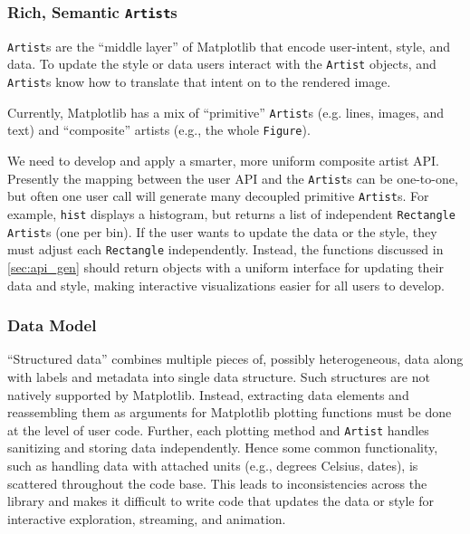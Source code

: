 \documentclass[11pt,letterpaper]{article}  %
\begin{document}
\subsubsection{Rich, Semantic \texttt{Artist}s}
\label{sec:artists}
\texttt{Artist}s are the ``middle layer'' of Matplotlib that encode
user-intent, style, and data.
To update the style or data users interact with the \texttt{Artist}
objects, and \texttt{Artist}s know how to
translate that intent on to the rendered image.

Currently, Matplotlib has a mix of ``primitive'' \texttt{Artist}s
(e.g. lines, images, and text) and ``composite'' artists (e.g.,
the whole \texttt{Figure}).

We need to develop and apply a smarter, more uniform composite artist API.
Presently the mapping between the user API and the \texttt{Artist}s can be
one-to-one, but often one user call will generate many decoupled
primitive \texttt{Artist}s.  For example, \texttt{hist} displays a histogram,
but returns a list of independent \texttt{Rectangle} \texttt{Artist}s
(one per bin).  If the user wants to update the data or the style,
they must adjust each \texttt{Rectangle} independently. Instead, the
functions discussed in \ref{sec:api_gen} should return objects with
a uniform interface for updating their data and style, making
interactive visualizations easier for all users to develop.


\subsubsection{Data Model}
\label{sec:dm}

``Structured data'' combines multiple pieces of, possibly
heterogeneous, data along with labels and metadata into single data
structure.
Such
structures are not natively supported by Matplotlib.  Instead, extracting
data elements and reassembling them as arguments for Matplotlib plotting
functions must be done at the level of user code.
Further, each plotting method and \texttt{Artist} handles sanitizing
and storing data independently.  Hence some common
functionality, such as handling data with attached units (e.g.,
degrees Celsius, dates), is scattered throughout the code base.  This
leads to inconsistencies across the library and makes it difficult to
write code that updates the data or style for interactive exploration,
streaming, and animation.
\end{document}
